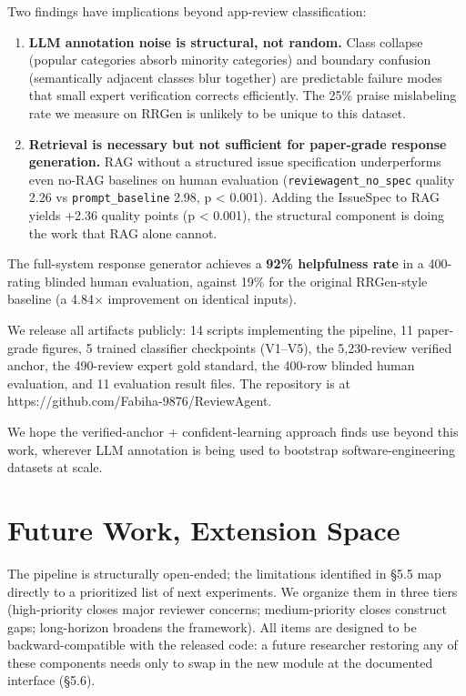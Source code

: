 \documentclass[sigconf, nonacm, anonymous, balance=false]{acmart}
\begin{document}
Two findings have implications beyond app-review classification:

\begin{enumerate}
\def\labelenumi{\arabic{enumi}.}
\item
  \textbf{LLM annotation noise is structural, not random.} Class collapse (popular categories absorb minority categories) and boundary confusion (semantically adjacent classes blur together) are predictable failure modes that small expert verification corrects efficiently. The 25\% praise mislabeling rate we measure on RRGen is unlikely to be unique to this dataset.
\item
  \textbf{Retrieval is necessary but not sufficient for paper-grade response generation.} RAG without a structured issue specification underperforms even no-RAG baselines on human evaluation (\texttt{reviewagent\_no\_spec} quality 2.26 vs \texttt{prompt\_baseline} 2.98, p \textless{} 0.001). Adding the IssueSpec to RAG yields +2.36 quality points (p \textless{} 0.001), the structural component is doing the work that RAG alone cannot.
\end{enumerate}

The full-system response generator achieves a \textbf{92\% helpfulness rate} in a 400-rating blinded human evaluation, against 19\% for the original RRGen-style baseline (a 4.84$\times$ improvement on identical inputs).

We release all artifacts publicly: 14 scripts implementing the pipeline, 11 paper-grade figures, 5 trained classifier checkpoints (V1--V5), the 5,230-review verified anchor, the 490-review expert gold standard, the 400-row blinded human evaluation, and 11 evaluation result files. The repository is at https://github.com/Fabiha-9876/ReviewAgent.

We hope the verified-anchor + confident-learning approach finds use beyond this work, wherever LLM annotation is being used to bootstrap software-engineering datasets at scale.

\section{Future Work, Extension Space}\label{future-work}

The pipeline is structurally open-ended; the limitations identified in §5.5 map directly to a prioritized list of next experiments. We organize them in three tiers (high-priority closes major reviewer concerns; medium-priority closes construct gaps; long-horizon broadens the framework). All items are designed to be backward-compatible with the released code: a future researcher restoring any of these components needs only to swap in the new module at the documented interface (§5.6).
\end{document}
